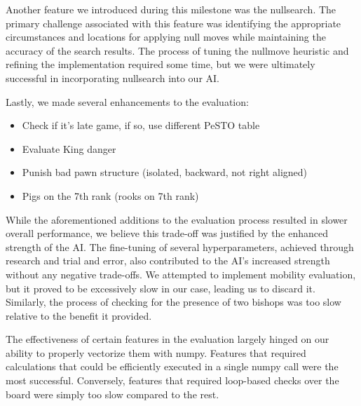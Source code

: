 Another feature we introduced during this milestone was the nullsearch. The primary challenge associated with this feature was identifying the appropriate circumstances and locations for applying null moves while maintaining the accuracy of the search results. The process of tuning the nullmove heuristic and refining the implementation required some time, but we were ultimately successful in incorporating nullsearch into our AI.

Lastly, we made several enhancements to the evaluation:

\begin{itemize}
  \item{Check if it's late game, if so, use different PeSTO table}
  \item{Evaluate King danger}
  \item{Punish bad pawn structure (isolated, backward, not right aligned)}
  \item{Pigs on the 7th rank (rooks on 7th rank)}
\end{itemize}

While the aforementioned additions to the evaluation process resulted in slower overall performance, we believe this trade-off was justified by the enhanced strength of the AI. The fine-tuning of several hyperparameters, achieved through research and trial and error, also contributed to the AI's increased strength without any negative trade-offs. We attempted to implement mobility evaluation, but it proved to be excessively slow in our case, leading us to discard it. Similarly, the process of checking for the presence of two bishops was too slow relative to the benefit it provided.

The effectiveness of certain features in the evaluation largely hinged on our ability to properly vectorize them with numpy. Features that required calculations that could be efficiently executed in a single numpy call were the most successful. Conversely, features that required loop-based checks over the board were simply too slow compared to the rest.
